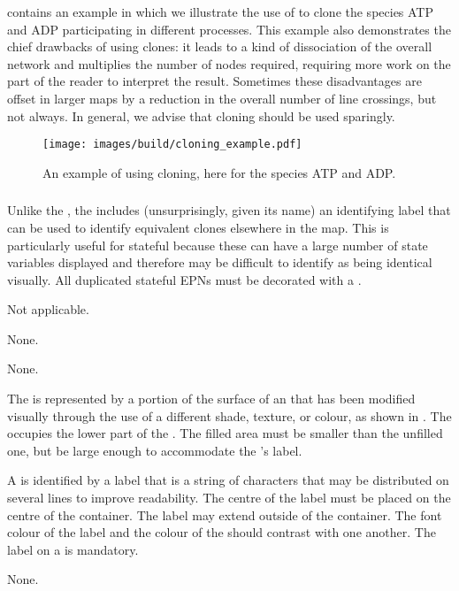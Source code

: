  contains an example in which we illustrate the use of  to clone the species ATP and ADP participating in different processes.  This example also demonstrates the chief drawbacks of using clones: it leads to a kind of dissociation of the overall network and multiplies the number of nodes required, requiring more work on the part of the reader to interpret the result.  Sometimes these disadvantages are offset in larger maps by a reduction in the overall number of line crossings, but not always.  In general, we advise that cloning should be used sparingly.

\begin{figure}[H]
  \centering
  \texttt{[image: images/build/cloning\_example.pdf]}
  \caption{An example of using cloning, here for the species ATP and ADP.}
  \label{fig:example-cloning}
\end{figure}

\subsubsection{}

Unlike the , the  includes (unsurprisingly, given its name) an identifying label that can be used to identify equivalent clones elsewhere in the map.
This is particularly useful for stateful  because these can have a large number of state variables displayed and therefore may be difficult to identify as being identical visually.
All duplicated stateful EPNs must be decorated with a .

\begin{glyphDescription}

\glyphSboTerm Not applicable.

\glyphIncoming
None.

\glyphOutgoing
None.

\glyphContainer
The  is represented by a portion of the surface of an  that has been modified visually through the use of a different shade, texture, or colour, as shown in .
The  occupies the lower part of the .
The filled area must be smaller than the unfilled one, but be large enough to accommodate the 's label.

\glyphLabel
A  is identified by a label that is  a string of characters that may be distributed on several lines to improve readability.
The centre of the label must be placed on the centre of the container.
The label may extend outside of the container.
The font colour of the label and the colour of the  should contrast with one another.
The label on a  is mandatory.

\glyphAux
None.

\end{glyphDescription}

